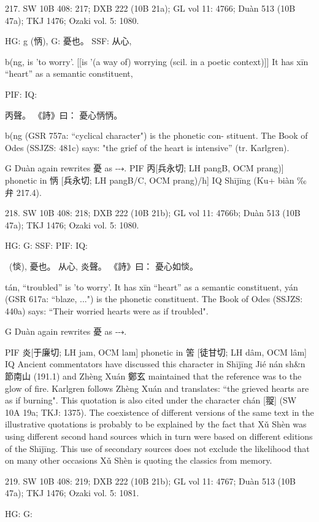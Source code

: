 {217. SW 10B 408: 217; DXB 222 (10B 21a); GL vol 11: 4766; Duàn 513 (10B 47a); TKJ 1476; Ozaki vol. 5: 1080.

HG:  g (怲),
G:	憂也。
SSF: 从心,


b(ng,
is 'to worry'. [[is '(a way of) worrying (scil. in a poetic context)]]
It has xīn ``heart'' as a semantic constituent,

PIF: IQ:

丙聲。
《詩》曰： 憂心怲怲。

b(ng (GSR 757a: ``cyclical character") is the phonetic con- stituent.
The Book of Odes (SSJZS: 481c) says:
"the grief of the heart is intensive'' (tr. Karlgren).

G	Duàn again rewrites 憂 as ⤏.
PIF     丙[兵永切; LH pangB, OCM prang)] phonetic in 怲 [兵永切; LH pangB/C, OCM prang)/h]
IQ	Shījīng (Ku+ biàn ‰弁 217.4).

218. SW 10B 408: 218; DXB 222 (10B 21b); GL vol 11: 4766b; Duàn 513 (10B 47a); TKJ 1476; Ozaki vol. 5: 1080.


HG:
G: SSF: PIF: IQ:

\ (惔), 憂也。
从心, 炎聲。
《詩》曰： 憂心如惔。

tán, ``troubled'' is 'to worry'.
It has xīn ``heart'' as a semantic constituent,
yán (GSR 617a: ``blaze, ...") is the phonetic constituent.
The Book of Odes (SSJZS: 440a) says: ``Their worried hearts were as if troubled".

G	Duàn again rewrites 憂 as ⤏.



PIF    炎[于廉切; LH jam, OCM lam] phonetic in 䇢 [徒甘切; LH dâm, OCM lâm]
IQ Ancient commentators have discussed this character in Shījīng Jié nán sh&n 節南山 (191.1) and Zhèng Xuán 鄭玄 maintained that the reference was to the glow of fire. Karlgren follows Zhèng Xuán and translates: ``the grieved hearts are as if burning". This quotation is also cited under the character chán [䎌] (SW 10A 19a; TKJ: 1375). The coexistence of different versions of the same text in the illustrative quotations is probably to be explained by the fact that Xǔ Shèn was using different second hand sources which in turn were based on different editions of the Shījīng. This use of secondary sources does not exclude the likelihood that on many other occasions Xǔ Shèn is quoting the classics from memory.


219. SW 10B 408: 219; DXB 222 (10B 21b); GL vol 11: 4767; Duàn 513 (10B 47a); TKJ 1476; Ozaki vol. 5: 1081.


HG:
G:

}
